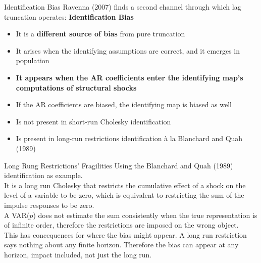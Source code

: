 \documentclass[11pt]{beamer}
\begin{document}
\begin{frame}{Identification Bias}\label{slide:identification_bias}
    Ravenna (2007) finds a second channel through which lag truncation operates: \textbf{\textcolor{PadovaRed}{Identification Bias}}
    \begin{itemize}
        \item It is a \textbf{different source of bias} from pure truncation
        \item It arises when the identifying assumptions are correct, and it emerges in population
        \item \textbf{It appears when the AR coefficients enter the identifying map's computations of structural shocks}
        \item If the AR coefficients are biased, the identifying map is biased as well
        \vspace{0.3cm}
        
        \item Is not present in short-run Cholesky identification
        \item Is present in long-run restrictions identification à la Blanchard and Quah (1989)
    \end{itemize}
    
    \begin{center}
        \hyperlink{slide:truncation_bias}{}
    \end{center}

\end{frame}

\begin{frame}{Long Rung Restrictions' Fragilities}
    Using the Blanchard and Quah (1989) identification as example.
    \\
    It is a long run Cholesky that restricts the cumulative effect of a shock on the level of a variable to be zero, which is equivalent to restricting the sum of the impulse responses to be zero.
    \vspace{0.3cm}
    \\
    A VAR($p$) does not estimate the sum consistently when the true representation is of infinite order,
    therefore the restrictions are imposed on the wrong object.
    \vspace{0.3cm}
    \\
    This has concequences for where the bias might appear. A long run restriction says nothing 
    about any finite horizon. Therefore the bias can appear at any horizon, impact included, not just the long run.

    \begin{center}
        \hyperlink{slide:truncation_bias}{}
    \end{center}

\end{frame}
\end{document}
